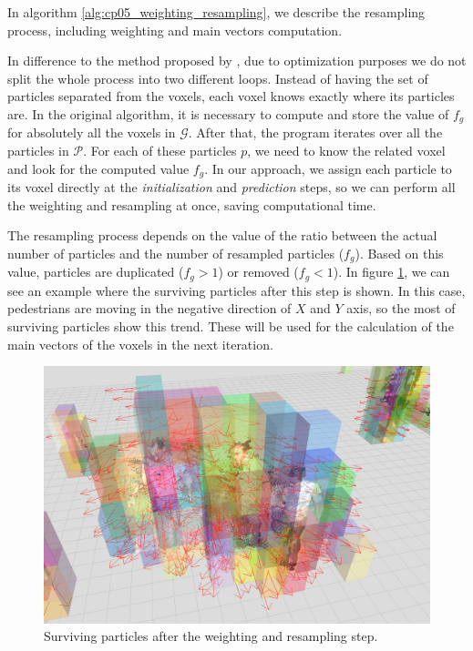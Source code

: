 In algorithm \ref{alg:cp05_weighting_resampling}, we describe the resampling process, including weighting and main vectors computation.

In difference to the method proposed by \cite{danescu2012particle}, due to optimization purposes we do not split the whole process into two different loops. Instead of having the set of particles separated from the voxels, each voxel knows exactly where its particles are. In the original algorithm, it is necessary to compute and store the value of $f_g$ for absolutely all the voxels in $\mathcal{G}$. After that, the program iterates over all the particles in $\mathcal{P}$. For each of these particles $p$, we need to know the related voxel and look for the computed value $f_g$. In our approach, we assign each particle to its voxel directly at the \emph{initialization} and \emph{prediction} steps, so we can perform all the weighting and resampling at once, saving computational time.

The resampling process depends on the value of the ratio between the actual number of particles and the number of resampled particles ($f_g$). Based on this value, particles are duplicated ($f_g > 1$) or removed ($f_g < 1$). In figure \ref{fig:cp05_weight_and_resample}, we can see an example where the surviving particles after this step is shown. In this case, pedestrians are moving in the negative direction of $X$ and $Y$ axis, so the most of surviving particles show this trend. These will be used for the calculation of the main vectors of the voxels in the next iteration.

\begin{figure}[t]
  \centering
  \includegraphics{weightAndResample}
  \caption{Surviving particles after the weighting and resampling step.}\label{fig:cp05_weight_and_resample}
\end{figure}

